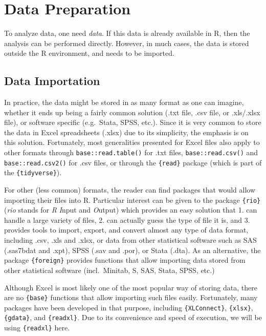 \documentclass[
]{book}
\begin{document}
\hypertarget{data_prep}{%
\chapter{Data Preparation}\label{data_prep}}

To analyze data, one need \emph{data}. If this data is already available in R, then the analysis can be performed directly. However, in much cases, the data is stored outside the R environment, and needs to be imported.

\hypertarget{data-importation}{%
\section{Data Importation}\label{data-importation}}

In practice, the data might be stored in as many format as one can imagine, whether it ends up being a fairly common solution (.txt file, .csv file, or .xls/.xlsx file), or software specific (e.g.~Stata, SPSS, etc.).
Since it is very common to store the data in Excel spreadsheets (.xlsx) due to its simplicity, the emphasis is on this solution. Fortunately, most generalities presented for Excel files also apply to other formats through \texttt{base::read.table()} for .txt files, \texttt{base::read.csv()} and \texttt{base::read.csv2()} for .csv files, or through the \texttt{\{read\}} package (which is part of the \texttt{\{tidyverse\}}).

For other (less common) formats, the reader can find packages that would allow importing their files into R. Particular interest can be given to the package \texttt{\{rio\}} (\emph{rio} stands for \emph{R} \emph{I}nput and \emph{O}utput) which provides an easy solution that 1. can handle a large variety of files, 2. can actually guess the type of file it is, and 3. provides tools to import, export, and convert almost any type of data format, including .csv, .xls and .xlsx, or data from other statistical software such as SAS (.sas7bdat and .xpt), SPSS (.sav and .por), or Stata (.dta). As an alternative, the package \texttt{\{foreign\}} provides functions that allow importing data stored from other statistical software (incl.~Minitab, S, SAS, Stata, SPSS, etc.)

Although Excel is most likely one of the most popular way of storing data, there are no \texttt{\{base\}} functions that allow importing such files easily. Fortunately, many packages have been developed in that purpose, including \texttt{\{XLConnect\}}, \texttt{\{xlsx\}}, \texttt{\{gdata\}}, and \texttt{\{readxl\}}. Due to its convenience and speed of execution, we will be using \texttt{\{readxl\}} here.
\end{document}
